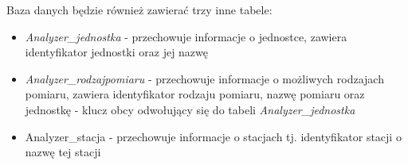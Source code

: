 \documentclass[11pt, a4paper, oneside]{mwart}
\begin{document}
	Baza danych będzie również zawierać trzy inne tabele:
\begin{itemize}
	\item \textit{Analyzer\_jednostka} - przechowuje informacje o jednostce, zawiera identyfikator jednostki oraz jej nazwę
	\item \textit{Analyzer\_rodzajpomiaru} - przechowuje informacje o możliwych rodzajach pomiaru, zawiera identyfikator rodzaju pomiaru, nazwę pomiaru oraz jednostkę - klucz obcy odwołujący się do tabeli \textit{Analyzer\_jednostka}
	\item{Analyzer\_stacja} - przechowuje informacje o stacjach tj. identyfikator stacji o nazwę tej stacji
\end{itemize}
\end{document}
